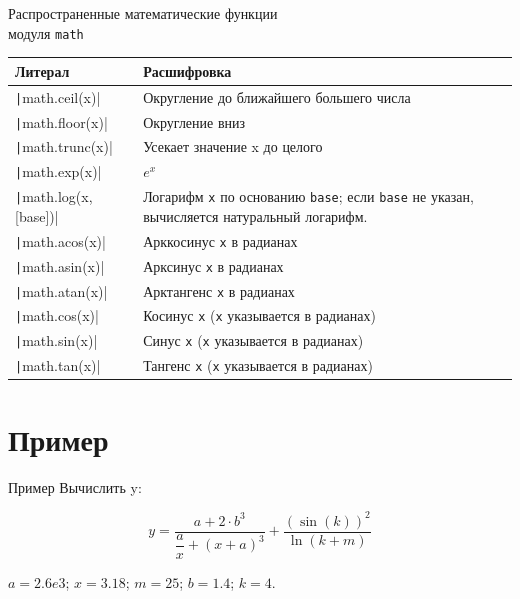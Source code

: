 \documentclass[aspectratio=169, mathserif]{beamer}	%
\begin{document}
\begin{frame}[fragile]{Распространенные математические функции \\ модуля \texttt{math}}
\scriptsize
\begin{table}
\begin{tabular}{|p{.3\linewidth}|p{.69\linewidth}|}
	\hline
	\textbf{Литерал} & \textbf{Расшифровка} \\
	\hline
	\texttt|math.ceil(x)| & Округление до ближайшего большего числа \\
	\texttt|math.floor(x)| & Округление вниз \\
	\texttt|math.trunc(x)| & Усекает значение x до целого \\
	
	\texttt|math.exp(x)| & $e^x$ \\
	\texttt|math.log(x, [base])| & Логарифм \texttt{x} по основанию \texttt{base}; если \texttt{base} не указан, вычисляется натуральный логарифм. \\
	\texttt|math.acos(x)| & Арккосинус \texttt{x} в радианах \\
	\texttt|math.asin(x)| & Арксинус \texttt{x} в радианах \\
	\texttt|math.atan(x)| & Арктангенс \texttt{x} в радианах \\
	\texttt|math.cos(x)| & Косинус \texttt{x} (\texttt{x} указывается в радианах) \\
	\texttt|math.sin(x)| & Синус \texttt{x} (\texttt{x} указывается в радианах) \\
	\texttt|math.tan(x)| & Тангенс \texttt{x} (\texttt{x} указывается в радианах) \\
	\hline
\end{tabular}
\end{table}
\vfill
\end{frame}

\section{Пример}
\sectionframe

\begin{frame}[fragile]{Пример}
\footnotesize
Вычислить y:
\begin{Large}
\begin{equation*}
	y = \dfrac{a + 2 \cdot b ^ 3}{\dfrac{a}{x} + \left(x + a\right)^3} + \dfrac{\left(\sin\left(k\right)\right)^2}{\ln \left(k + m\right)}
\end{equation*}
\end{Large}

\begin{center}
$a = 2.6e3$; \quad $x = 3.18$; \quad $m = 25$; \quad $b = 1.4$; \quad $k = 4$.
\end{center}
\vfill
\end{frame}
\end{document}

